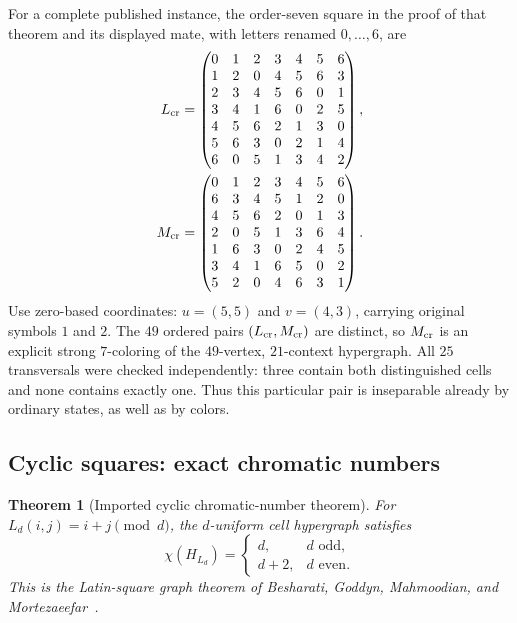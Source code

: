 \documentclass[aps,pra,reprint,superscriptaddress,longbibliography,nofootinbib,floatfix,10pt]{revtex4-2}
\newtheorem{theorem}{Theorem}
\theoremstyle{definition}\newtheorem{definition}[theorem]{Definition}
\theoremstyle{remark}\newtheorem{remark}[theorem]{Remark}
\begin{document}
For a complete published instance, the order-seven square in the proof of that theorem and its displayed mate, with letters renamed $0,\ldots,6$, are
\begin{equation}\label{eq:crimped-seven}
\begin{aligned}
L_{\rm cr}&=\begin{pmatrix}
0&1&2&3&4&5&6\\1&2&0&4&5&6&3\\2&3&4&5&6&0&1\\3&4&1&6&0&2&5\\4&5&6&2&1&3&0\\5&6&3&0&2&1&4\\6&0&5&1&3&4&2
\end{pmatrix},\\
M_{\rm cr}&=\begin{pmatrix}
0&1&2&3&4&5&6\\6&3&4&5&1&2&0\\4&5&6&2&0&1&3\\2&0&5&1&3&6&4\\1&6&3&0&2&4&5\\3&4&1&6&5&0&2\\5&2&0&4&6&3&1
\end{pmatrix}.
\end{aligned}
\end{equation}
Use zero-based coordinates: $u=(5,5)$ and $v=(4,3)$, carrying original symbols $1$ and $2$. The $49$ ordered pairs $(L_{\rm cr},M_{\rm cr})$ are distinct, so $M_{\rm cr}$ is an explicit strong $7$-coloring of the $49$-vertex, $21$-context hypergraph. All $25$ transversals were checked independently: three contain both distinguished cells and none contains exactly one. Thus this particular pair is inseparable already by ordinary states, as well as by colors.

\subsection{Cyclic squares: exact chromatic numbers}\label{sec:cyclic-exact}

\begin{theorem}[Imported cyclic chromatic-number theorem]\label{thm:cyclic-exact}
For $L_d(i,j)=i+j\pmod d$, the $d$-uniform cell hypergraph satisfies
\begin{equation}\label{eq:cyclic-chi}
\chi(H_{L_d})=\begin{cases}d,&d\text{ odd},\\d+2,&d\text{ even}.\end{cases}
\end{equation}
This is the Latin-square graph theorem of Besharati, Goddyn, Mahmoodian, and Mortezaeefar~\cite[Theorem 3]{besharati2016latin}.
\end{theorem}
\end{document}
